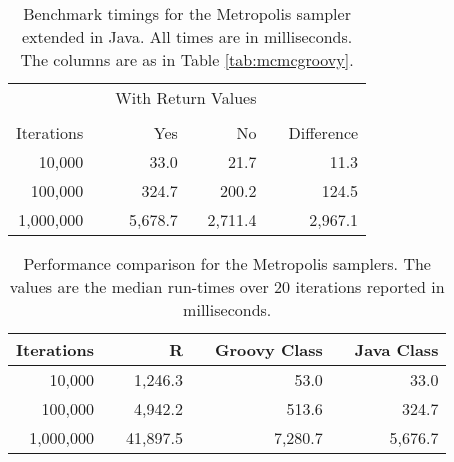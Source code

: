 \vspace{0.33cm}

\begin{table}[h!]
\centering
\caption{Benchmark timings for the Metropolis sampler extended in Java. All times are in milliseconds. The columns are as in Table \ref{tab:mcmcgroovy}.}
\begin{tabular}{rrrrrr}
\toprule
& & \multicolumn{2}{c}{With Return Values} & & \\
\cline{3-4} \\[-8pt]
Iterations & & \multicolumn{1}{r}{Yes} & \multicolumn{1}{r}{No} & & Difference \\ \midrule
10,000 & & 33.0 & 21.7 & & 11.3 \\
100,000 & & 324.7 & 200.2 & & 124.5 \\
1,000,000 & & 5,678.7 & 2,711.4 & & 2,967.1 \\ \bottomrule
\end{tabular}
\label{tab:mcmcjava}
\end{table}

\begin{table}[h!]
\centering
\caption{Performance comparison for the Metropolis samplers. The values are the median run-times over 20 iterations reported in milliseconds.}
\begin{tabular}{rrrrrrr}
\toprule
Iterations & & R        & & Groovy Class & & Java Class \\ \midrule
10,000     & & 1,246.3  & & 53.0         & & 33.0       \\
100,000    & & 4,942.2  & & 513.6        & & 324.7      \\
1,000,000  & & 41,897.5 & & 7,280.7      & & 5,676.7    \\ \bottomrule
\end{tabular}
\label{tab:mcmccomparison}
\end{table}

